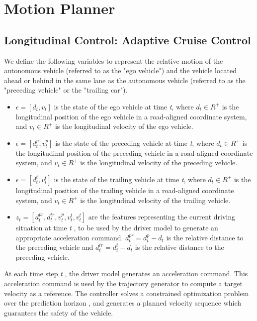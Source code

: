 \section{Motion Planner}

\subsection{Longitudinal Control:  Adaptive Cruise Control}

We define the following variables to represent the relative motion of the autonomous vehicle (referred to as the "ego vehicle") and the vehicle located ahead or behind in the same lane as the autonomous vehicle (referred to as the "preceding vehicle" or the "trailing car").

\begin{itemize}
\item $\epsilon = [d_t, v_t]$ is the state of the ego vehicle at time \textit{t}, where $d_t \in R^+$ is the longitudinal position of the ego vehicle in a road-aligned coordinate system, and $v_t \in R^+$ is the longitudinal velocity of the ego vehicle.
\item $\epsilon = [d_t^p, v_t^p]$ is the state of the preceding vehicle at time \textit{t}, where $d_t \in R^+$ is the longitudinal position of the preceding vehicle in a road-aligned coordinate system, and $v_t \in R^+$ is the longitudinal velocity of the preceding vehicle.
\item $\epsilon = [d_t^t, v_t^t]$ is the state of the trailing vehicle at time \textit{t}, where $d_t \in R^+$ is the longitudinal position of the trailing vehicle in a road-aligned coordinate system, and $v_t \in R^+$ is the longitudinal velocity of the trailing vehicle.
\item $z_t =  [d_t^{pr}, d_t^{tr}, v_t^p, v_t^t, v_t^t]$ are the features representing the current driving situation at time \textit{t} , to be used by the driver model to generate an appropriate acceleration command. $d_t^{pr} = d_t^p - d_t$ is the relative distance to the preceding vehicle and $d_t^{tr} = d_t^t - d_t$ is the relative distance to the preceding vehicle.
\end{itemize}

At each time step \textit{t} , the driver model generates an acceleration command. This acceleration command is used by the trajectory generator to compute a target velocity as a reference. The controller solves a constrained optimization problem over the prediction horizon , and generates a planned velocity sequence which guarantees the safety of the vehicle.

